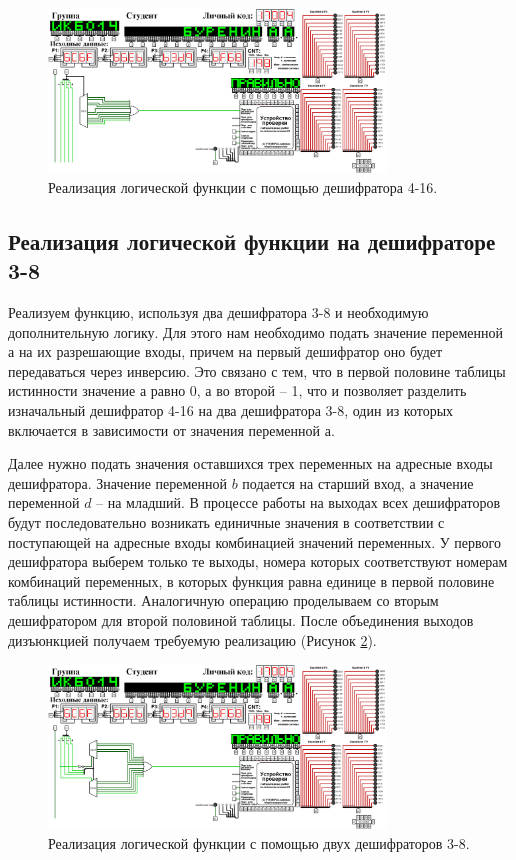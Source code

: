 \documentclass[a4paper]{article}
\begin{document}
	\begin{figure}[h]
		\centering
		\includegraphics[width=0.8\textwidth]{4-16.png}
		\caption{\centering Реализация логической функции с помощью дешифратора 4-16.}\label{img:decoder-4-16}

	\end{figure}
	
	\subsection{Реализация логической функции на дешифраторе 3-8}
	Реализуем функцию, используя два дешифратора 3-8 и необходимую дополнительную логику. Для этого нам необходимо подать значение переменной $ а $ на их разрешающие входы, причем на первый дешифратор оно будет передаваться через инверсию. Это связано с тем, что в первой половине таблицы истинности значение $ а $ равно 0, а во второй – 1, что и позволяет разделить изначальный дешифратор 4-16 на два дешифратора 3-8, один из которых включается в зависимости от значения переменной $ а $. 
	
	Далее нужно подать значения оставшихся трех переменных на адресные входы дешифратора. Значение переменной $ b $ подается на старший вход, а значение переменной $ d $ – на младший. В процессе работы на выходах всех дешифраторов будут последовательно возникать единичные значения в соответствии с поступающей на адресные входы комбинацией значений переменных. У первого дешифратора выберем только те выходы, номера которых соответствуют номерам комбинаций переменных, в которых функция равна единице в первой половине таблицы истинности. Аналогичную операцию проделываем со вторым дешифратором для второй половиной таблицы. После объединения выходов дизъюнкцией получаем требуемую реализацию (Рисунок \ref{img:decoder-3-8}).
	
	\begin{figure}[h]
		\centering
		\includegraphics[width=0.8\textwidth]{3-8.png}
		
		\caption{\centering Реализация логической функции с помощью двух дешифраторов 3-8.}
		\label{img:decoder-3-8}
	\end{figure}
	
\end{document}
